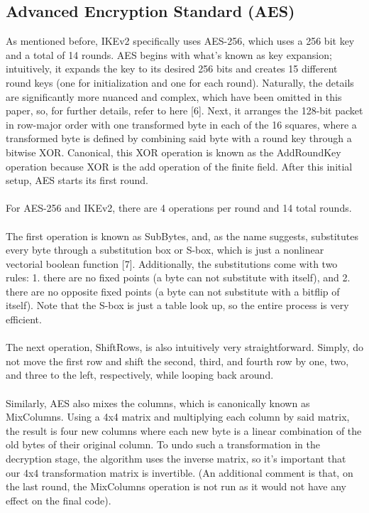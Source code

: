 \documentclass[runningheads]{llncs}
\begin{document}
\subsection{Advanced Encryption Standard (AES)}
As mentioned before, IKEv2 specifically uses AES-256, which uses a 256 bit key and a total of 14 rounds. AES begins with what’s known as key expansion; intuitively, it expands the key to its desired 256 bits and creates 15 different round keys (one for initialization and one for each round). Naturally, the details are significantly more nuanced and complex, which have been omitted in this paper, so, for further details, refer to here [6]. Next, it arranges the 128-bit packet in row-major order with one transformed byte in each of the 16 squares, where a transformed byte is defined by combining said byte with a round key through a bitwise XOR. Canonical, this XOR operation is known as the AddRoundKey operation because XOR is the add operation of the finite field. After this initial setup, AES starts its first round.\\
\\
For AES-256 and IKEv2, there are 4 operations per round and 14 total rounds.\\
\\
The first operation is known as SubBytes, and, as the name suggests, substitutes every byte through a substitution box or S-box, which is just a nonlinear vectorial boolean function [7]. Additionally, the substitutions come with two rules: 1. there are no fixed points (a byte can not substitute with itself), and 2. there are no opposite fixed points (a byte can not substitute with a bitflip of itself). Note that the S-box is just a table look up, so the entire process is very efficient.\\
\\
The next operation, ShiftRows, is also intuitively very straightforward. Simply, do not move the first row and shift the second, third, and fourth row by one, two, and three to the left, respectively, while looping back around.\\
\\
Similarly, AES also mixes the columns, which is canonically known as MixColumns. Using a 4x4 matrix and multiplying each column by said matrix, the result is four new columns where each new byte is a linear combination of the old bytes of their original column. To undo such a transformation in the decryption stage, the algorithm uses the inverse matrix, so it's important that our 4x4 transformation matrix is invertible. (An additional comment is that, on the last round, the MixColumns operation is not run as it would not have any effect on the final code).
\end{document}
